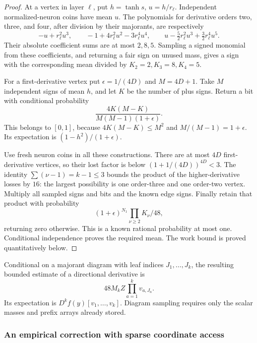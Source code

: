 \begin{proof}
At a vertex in layer $\ell$, put $h=\tanh s$, $u=h/r_\ell$.
Independent normalized-neuron coins have mean $u$.  The polynomials
for derivative orders two, three, and four, after division by their
majorants, are respectively
\[
 -u+r_\ell^2u^3,\qquad
 -1+4r_\ell^2u^2-3r_\ell^4u^4,\qquad
 u-\tfrac52r_\ell^2u^3+\tfrac32r_\ell^4u^5.
\]
Their absolute coefficient sums are at most $2,8,5$.  Sampling a
signed monomial from these coefficients, and returning a fair sign
on unused mass, gives a sign with the corresponding mean divided by
$K_2=2,K_3=8,K_4=5$.

For a first-derivative vertex put $\epsilon=1/(4D)$ and $M=4D+1$.
Take $M$ independent signs of mean $h$, and let $K$ be the number of
plus signs.  Return a bit with conditional probability
\begin{equation}
 \frac{4K(M-K)}{M(M-1)(1+\epsilon)}.
 \label{eq:column-first-derivative-factory}
\end{equation}
This belongs to $[0,1]$, because
$4K(M-K)\le M^2$ and $M/(M-1)=1+\epsilon$.
Its expectation is $(1-h^2)/(1+\epsilon)$.

Use fresh neuron coins in all these constructions.  There are at most
$4D$ first-derivative vertices, so their lost factor is below
$(1+1/(4D))^{4D}<3$.  The identity
$\sum(\nu-1)=k-1\le3$ bounds the product of the higher-derivative
losses by $16$: the largest possibility is one order-three and one
order-two vertex.  Multiply all sampled signs and bits and the known
edge signs.  Finally retain that product with probability
\[
 (1+\epsilon)^{N_1}\prod_{\nu\ge2}K_\nu/48,
\]
returning zero otherwise.  This is a known rational probability at
most one.  Conditional independence proves the required mean.
The work bound is proved quantitatively below.
\end{proof}

Conditional on a majorant diagram with leaf indices $J_1,\ldots,J_k$,
the resulting bounded estimate of a directional derivative is
\begin{equation}
 48M_k Z\prod_{a=1}^k v_{a,J_a}.
 \label{eq:column-directional-estimator}
\end{equation}
Its expectation is $D^kf(y)[v_1,\ldots,v_k]$.  Diagram sampling
requires only the scalar masses and prefix arrays already stored.

\subsubsection{An empirical correction with sparse coordinate access}

